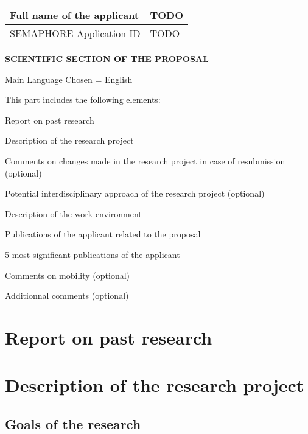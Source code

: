 \documentclass{fnrscq}
\begin{document}
{\small
\begin{tabular}{| p{.49\linewidth} | p{.49\linewidth} |}
  \hline
  Full name of the applicant & TODO\\
  \hline
  SEMAPHORE Application ID & TODO\\
  \hline
\end{tabular}
}

\begin{center}
{\large
\fontsize{16pt}{16pt}\selectfont
 \textbf{SCIENTIFIC SECTION OF THE PROPOSAL}}

{\footnotesize\sc Main Language Chosen = English}
\end{center}

{\footnotesize
\begin{mdframed}[userdefinedwidth=11cm,align=center]
This part includes the following elements:
\begin{compactenum}
\item Report on past research
\item Description of the research project
\item Comments on changes made in the research project in case of resubmission (optional)
\item Potential interdisciplinary approach of the research project (optional)
\item Description of the work environment 
\item Publications of the applicant related to the proposal
\item 5 most significant publications of the applicant
\item Comments on mobility (optional)
\item Additionnal comments (optional)
\end{compactenum}
\end{mdframed}
}

\clearpage


\section{Report on past research}


\section{Description of the research project}

\subsection{Goals of the research}
\end{document}
